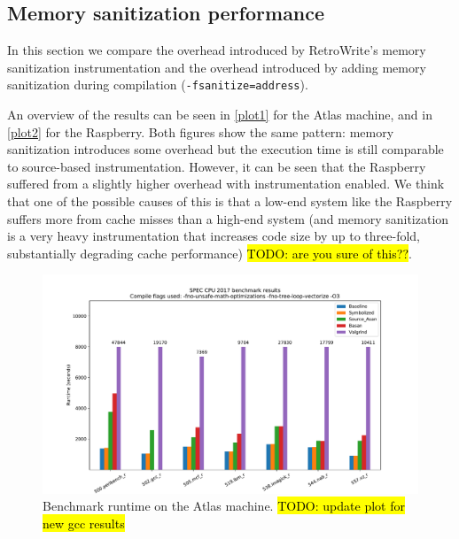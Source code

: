 \documentclass[a4paper,11pt,oneside]{report}
\newcommand{\sysname}{RetroWrite\xspace}
\DeclareRobustCommand{\todo}[1]{{\sethlcolor{cyan}\hl{TODO: #1}}}
\begin{document}
\subsection{Memory sanitization performance}


In this section we compare the overhead introduced by \sysname's memory
sanitization instrumentation and the overhead introduced by adding memory
sanitization during compilation (\texttt{-fsanitize=address}).  

An overview of the results can be seen in \autoref{plot1} for the Atlas machine,
and in \autoref{plot2} for the Raspberry. Both figures show the same pattern: 
memory sanitization introduces some overhead but the execution time is still comparable
to source-based instrumentation. However, it can be seen that the Raspberry suffered
from a slightly higher overhead with instrumentation enabled. We think that one of the
possible causes of this is that a low-end system like the Raspberry suffers more from
cache misses than a high-end system (and memory sanitization is a very heavy instrumentation
that increases code size by up to three-fold, substantially degrading cache performance) \todo{are you sure of this??}. 

\begin{figure}[h]
\includegraphics[width=15cm]{cloudlab.pdf}
\centering
	\caption{Benchmark runtime on the Atlas machine. \todo{update plot for new gcc results} } 
\label{plot1}
\end{figure}
\end{document}
